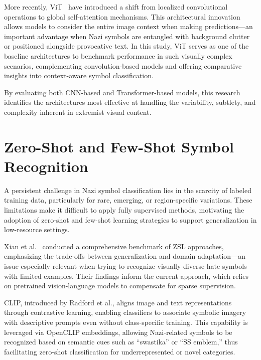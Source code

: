 More recently, \ac{ViT}~\parencite{dosovitskiy2020image} have introduced a shift from localized
convolutional operations to global self-attention mechanisms. This architectural innovation allows models to
consider the entire image context when making predictions—an important advantage when Nazi symbols are entangled
with background clutter or positioned alongside provocative text. In this study, ViT serves as one of the baseline
architectures to benchmark performance in such visually complex scenarios, complementing convolution-based models
and offering comparative insights into context-aware symbol classification.

By evaluating both \ac{CNN}-based and Transformer-based models, this research identifies the architectures most
effective
at handling the variability, subtlety, and complexity inherent in extremist visual content.

\section{Zero-Shot and Few-Shot Symbol Recognition}

A persistent challenge in Nazi symbol classification lies in the scarcity of labeled training data, particularly for
rare, emerging, or region-specific variations. These limitations make it difficult to apply fully supervised
methods, motivating the adoption of zero-shot and few-shot learning strategies to support generalization in
low-resource settings.

Xian et al.~\parencite{xian2017zeroshot} conducted a comprehensive benchmark of \ac{ZSL} approaches, emphasizing the
trade-offs between generalization and domain adaptation—an issue especially relevant when trying to recognize
visually diverse hate symbols with limited examples. Their findings inform the current approach, which relies on
pretrained vision-language models to compensate for sparse supervision.

CLIP, introduced by Radford et al.\parencite{radford2021clip}, aligns image and text representations through
contrastive learning\parencite{chen2020simpleframeworkcontrastivelearning}, enabling classifiers to associate
symbolic imagery with descriptive prompts even without class-specific training. This capability is leveraged via
OpenCLIP embeddings, allowing Nazi-related symbols to be recognized based on semantic cues such as “swastika” or “SS
emblem,” thus facilitating zero-shot classification for underrepresented or novel categories.

